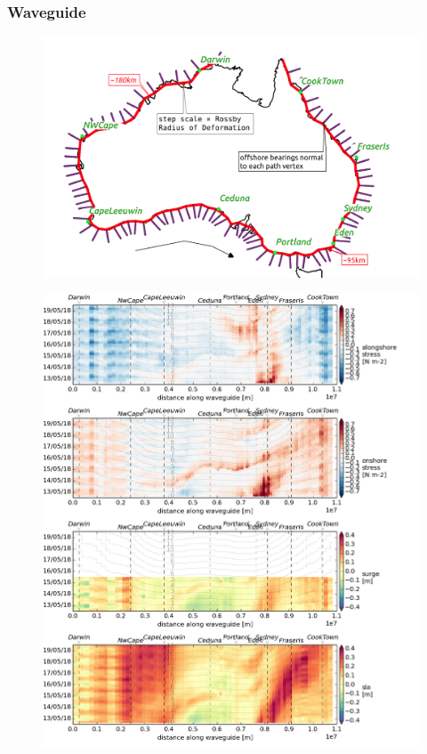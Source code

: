 \begin{frame}
\frametitle{Waveguide}
\begin{minipage}{0.45\textwidth}
    \begin{figure}      
    \includegraphics[width=\textwidth]{figures/maps/map_overview.png}
    \end{figure}
\end{minipage}
\hfill
\begin{minipage}{0.45\textwidth}
    \begin{figure}      
    \includegraphics[width=\textwidth]{figures/plots/collate_g.png}
    \end{figure}
\end{minipage}
\end{frame}
